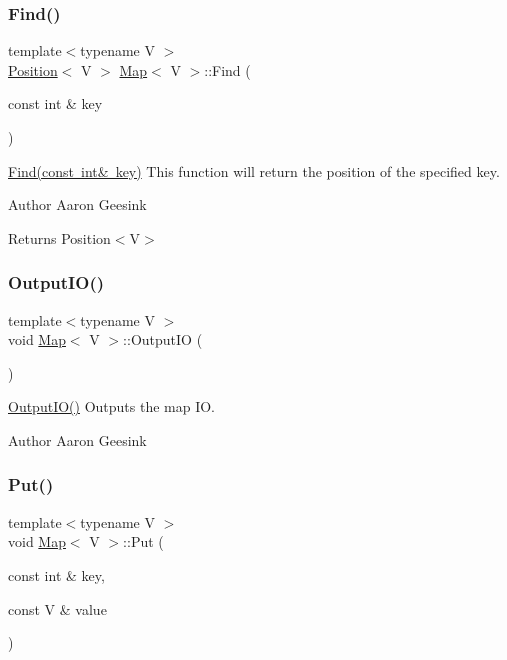 \subsubsection{\texorpdfstring{Find()}{Find()}}
{\footnotesize\ttfamily template$<$typename V $>$ \\
\mbox{\hyperlink{class_position}{Position}}$<$ V $>$ \mbox{\hyperlink{class_map}{Map}}$<$ V $>$\+::Find (\begin{DoxyParamCaption}\item[{const int \&}]{key }\end{DoxyParamCaption})}



\mbox{\hyperlink{class_map_a5a4498cca2ab6536d04915f07ca5f01f}{Find(const int\& key)}} This function will return the position of the specified key. 

\begin{DoxyAuthor}{Author}
Aaron Geesink 
\end{DoxyAuthor}
\begin{DoxyReturn}{Returns}
Position$<$\+V$>$ 
\end{DoxyReturn}
\mbox{\label{class_map_a2f04ee3a341608930df81062df179453}} 
\subsubsection{\texorpdfstring{OutputIO()}{OutputIO()}}
{\footnotesize\ttfamily template$<$typename V $>$ \\
void \mbox{\hyperlink{class_map}{Map}}$<$ V $>$\+::Output\+IO (\begin{DoxyParamCaption}{ }\end{DoxyParamCaption})}



\mbox{\hyperlink{class_map_a2f04ee3a341608930df81062df179453}{Output\+I\+O()}} Outputs the map IO. 

\begin{DoxyAuthor}{Author}
Aaron Geesink 
\end{DoxyAuthor}
\mbox{\label{class_map_acc047d86867d1093a12c152aaa99dff2}} 
\subsubsection{\texorpdfstring{Put()}{Put()}}
{\footnotesize\ttfamily template$<$typename V $>$ \\
void \mbox{\hyperlink{class_map}{Map}}$<$ V $>$\+::Put (\begin{DoxyParamCaption}\item[{const int \&}]{key,  }\item[{const V \&}]{value }\end{DoxyParamCaption})}



